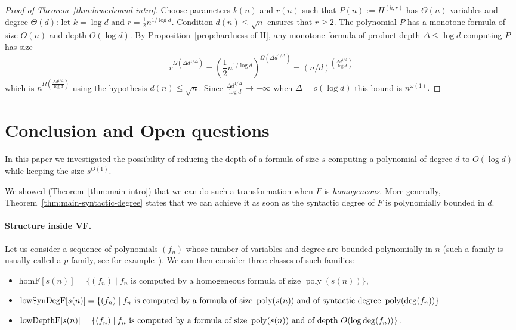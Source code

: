 \documentclass[11pt,a4paper]{article}
\newcommand{\poly}{\mathop{\mathrm{poly}}}
\begin{document}
\begin{proof}[Proof of Theorem~\ref{thm:lowerbound-intro}]
	Choose parameters $k(n)$ and $r(n)$ 
	such that $P(n):=H^{(k,r)}$ has $\Theta(n)$ variables and degree $\Theta(d)$: let
	$k=\log d$ and $r=\frac{1}{2} n^{1/\log d}$.
	Condition $d(n)\leq \sqrt{n}$ ensures that $r\geqslant 2$.
	The polynomial $P$ has a monotone formula of size $O(n)$ and depth $O(\log d)$.
	By Proposition~\ref{prop:hardness-of-H}, 
	any monotone formula of product-depth $\Delta \leq \log d$ computing $P$
	has size
	$$r^{\Omega(\Delta d^{1/\Delta})} = 
	\left(\frac{1}{2} n^{1/\log d}\right)^{\Omega(\Delta d^{1/\Delta})} 
	= (n/d)^{\left( \frac{\Delta d^{1/\Delta}}{\log d} \right)}$$
	which is $n^{\Omega \left( \frac{\Delta d^{1/\Delta}}{\log d} \right)}$
	using the hypothesis $d(n)\leq \sqrt{n}$.
	Since $\frac{\Delta d^{1/\Delta}}{\log d} \rightarrow +\infty$ when $\Delta = o \left(\log d \right)$ this bound is $n^{\omega(1)}.$
\end{proof}



\section{Conclusion and Open questions}
\label{sec:final}

In this paper we investigated the possibility of reducing the depth of a formula of size \(s\) computing a polynomial of degree \(d\) to \(O(\log d)\) while keeping the size \(s^{O(1)}\).

We showed (Theorem~\ref{thm:main-intro}) that we can do such a transformation when \(F\) is {\em homogeneous}. More generally, Theorem~\ref{thm:main-syntactic-degree} states that we can achieve it as soon as the syntactic degree of \(F\) is polynomially bounded in \(d\). 



\paragraph*{Structure inside VF.} Let us consider  a sequence of polynomials $(f_n)$ whose number of variables and  degree are bounded polynomially in \(n\) (such a family is usually called a \(p\)-family, see for example~\cite{BurgisserVPVNP}). We can then consider three classes of such families:
\begin{itemize}
	\item \(\text{homF}[s(n)] = \{ (f_n) \mid  f_n \text{ is computed by a homogeneous formula of size }\poly(s(n))\}\), 
	\item \(\text{lowSynDegF}[s(n)] = \{ (f_n) \mid f_n \text{ is computed by a formula of size }\poly(s(n)) \text{ and of} \\ \text{ syntactic degree } \poly(\deg(f_n))\}\)
	\item \(\text{lowDepthF}[s(n)] = \{ (f_n) \mid f_n \text{ is computed by a formula of size }\poly(s(n)) \text{ and of} \\ \text{ depth } O(\log \deg(f_n))\}\).
\end{itemize}
\end{document}
